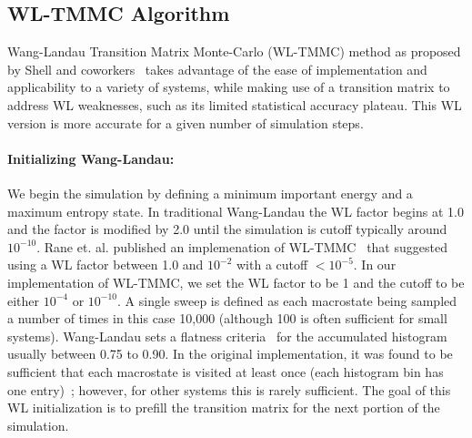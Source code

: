 \documentclass[letterpaper,twocolumn,amsmath,amssymb,pre,aps,10pt]{revtex4-1}
\begin{document}
\subsection{WL-TMMC Algorithm}

Wang-Landau Transition Matrix Monte-Carlo (WL-TMMC) method as proposed
by Shell and coworkers~\cite{shell2003improved,shell2004flat} takes
advantage of the ease of implementation and applicability to a variety
of systems, while making use of a transition matrix to address WL
weaknesses, such as its limited statistical accuracy plateau.
This WL version is more accurate for a given number of simulation steps.

\paragraph{Initializing Wang-Landau:} We begin the simulation by
defining a minimum important energy and a maximum entropy state. In
traditional Wang-Landau the WL factor begins at 1.0 and the factor is
modified by 2.0 until the simulation is cutoff typically around
$10^{-10}$.  Rane et. al. published an implemenation of
WL-TMMC~\cite{rane2013monte} that suggested using a WL factor between
1.0 and $10^{-2}$ with a cutoff $<10^{-5}$. In our implementation of
WL-TMMC, we set the WL factor to be 1 and the cutoff to be either
$10^{-4}$ or $10^{-10}$. A single sweep is defined as each macrostate
being sampled a number of times in this case 10,000 (although 100 is
often sufficient for small systems). Wang-Landau sets a flatness
criteria~\cite{wang2001determining, wang2001efficient,
hatch2015computational, mahynski2017predicting} for the accumulated
histogram usually between 0.75 to 0.90.  In the original
implementation, it was found to be sufficient that each macrostate is
visited at least once (each histogram bin has one
entry)~\cite{shell2003improved}; however, for other systems this is
rarely sufficient.  The goal of this WL initialization is to prefill
the transition matrix for the next portion of the simulation.
\end{document}
